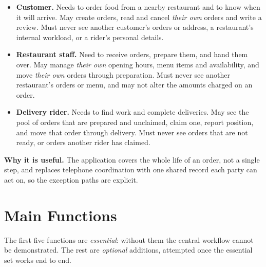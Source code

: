 \begin{itemize}
\item \textbf{Customer.} Needs to order food from a nearby restaurant and to know when it will
arrive. May create orders, read and cancel \emph{their own} orders and write a review. Must
never see another customer's orders or address, a restaurant's internal workload, or a rider's
personal details.
\item \textbf{Restaurant staff.} Need to receive orders, prepare them, and hand them over.
May manage \emph{their own} opening hours, menu items and availability, and move \emph{their
own} orders through preparation. Must never see another restaurant's orders or menu, and may
not alter the amounts charged on an order.
\item \textbf{Delivery rider.} Needs to find work and complete deliveries. May see the pool of
orders that are prepared and unclaimed, claim one, report position, and move that order through
delivery. Must never see orders that are not ready, or orders another rider has claimed.
\end{itemize}

\noindent\textbf{Why it is useful.} The application covers the whole life of an order, not a single step, and replaces telephone
coordination with one shared record each party can act on, so the exception paths are explicit.

\section{Main Functions}

The first five functions are \emph{essential}: without them the central workflow cannot be
demonstrated. The rest are \emph{optional}
additions, attempted once the essential set works end to end.

